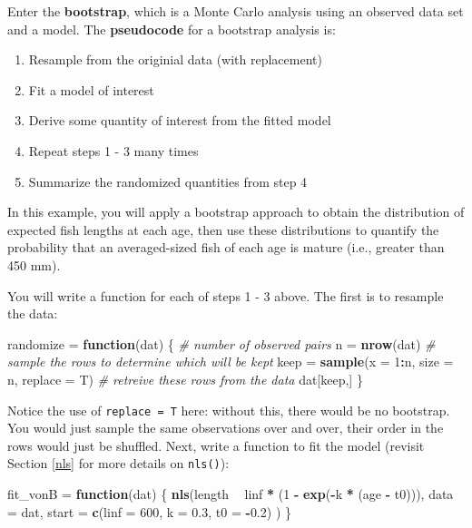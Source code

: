 \documentclass[]{book}
\newenvironment{Shaded}{\begin{snugshade}}{\end{snugshade}}
\newcommand{\KeywordTok}[1]{\textcolor[rgb]{0.13,0.29,0.53}{\textbf{#1}}}
\newcommand{\DataTypeTok}[1]{\textcolor[rgb]{0.13,0.29,0.53}{#1}}
\newcommand{\DecValTok}[1]{\textcolor[rgb]{0.00,0.00,0.81}{#1}}
\newcommand{\FloatTok}[1]{\textcolor[rgb]{0.00,0.00,0.81}{#1}}
\newcommand{\StringTok}[1]{\textcolor[rgb]{0.31,0.60,0.02}{#1}}
\newcommand{\CommentTok}[1]{\textcolor[rgb]{0.56,0.35,0.01}{\textit{#1}}}
\newcommand{\ControlFlowTok}[1]{\textcolor[rgb]{0.13,0.29,0.53}{\textbf{#1}}}
\newcommand{\OperatorTok}[1]{\textcolor[rgb]{0.81,0.36,0.00}{\textbf{#1}}}
\newcommand{\NormalTok}[1]{#1}
\providecommand{\tightlist}{%
  \setlength{\itemsep}{0pt}\setlength{\parskip}{0pt}}
\theoremstyle{definition}
\theoremstyle{definition}
\theoremstyle{definition}
\theoremstyle{remark}
\begin{document}
Enter the \textbf{bootstrap}, which is a Monte Carlo analysis using an
observed data set and a model. The \textbf{pseudocode} for a bootstrap
analysis is:

\begin{enumerate}
\def\labelenumi{\arabic{enumi}.}
\tightlist
\item
  Resample from the originial data (with replacement)
\item
  Fit a model of interest
\item
  Derive some quantity of interest from the fitted model
\item
  Repeat steps 1 - 3 many times
\item
  Summarize the randomized quantities from step 4
\end{enumerate}

In this example, you will apply a bootstrap approach to obtain the
distribution of expected fish lengths at each age, then use these
distributions to quantify the probability that an averaged-sized fish of
each age is mature (i.e., greater than 450 mm).

You will write a function for each of steps 1 - 3 above. The first is to
resample the data:

\begin{Shaded}
\begin{Highlighting}[]
\NormalTok{randomize =}\StringTok{ }\ControlFlowTok{function}\NormalTok{(dat) \{}
  \CommentTok{# number of observed pairs}
\NormalTok{  n =}\StringTok{ }\KeywordTok{nrow}\NormalTok{(dat)}
  \CommentTok{# sample the rows to determine which will be kept}
\NormalTok{  keep =}\StringTok{ }\KeywordTok{sample}\NormalTok{(}\DataTypeTok{x =} \DecValTok{1}\OperatorTok{:}\NormalTok{n, }\DataTypeTok{size =}\NormalTok{ n, }\DataTypeTok{replace =}\NormalTok{ T)}
  \CommentTok{# retreive these rows from the data}
\NormalTok{  dat[keep,]}
\NormalTok{\}}
\end{Highlighting}
\end{Shaded}

Notice the use of \texttt{replace\ =\ T} here: without this, there would
be no bootstrap. You would just sample the same observations over and
over, their order in the rows would just be shuffled. Next, write a
function to fit the model (revisit Section \ref{nls} for more details on
\texttt{nls()}):

\begin{Shaded}
\begin{Highlighting}[]
\NormalTok{fit_vonB =}\StringTok{ }\ControlFlowTok{function}\NormalTok{(dat) \{}
  \KeywordTok{nls}\NormalTok{(length }\OperatorTok{~}\StringTok{ }\NormalTok{linf }\OperatorTok{*}\StringTok{ }\NormalTok{(}\DecValTok{1} \OperatorTok{-}\StringTok{ }\KeywordTok{exp}\NormalTok{(}\OperatorTok{-}\NormalTok{k }\OperatorTok{*}\StringTok{ }\NormalTok{(age }\OperatorTok{-}\StringTok{ }\NormalTok{t0))),}
      \DataTypeTok{data =}\NormalTok{ dat,}
      \DataTypeTok{start =} \KeywordTok{c}\NormalTok{(}\DataTypeTok{linf =} \DecValTok{600}\NormalTok{, }\DataTypeTok{k =} \FloatTok{0.3}\NormalTok{, }\DataTypeTok{t0 =} \OperatorTok{-}\FloatTok{0.2}\NormalTok{)}
\NormalTok{      )}
\NormalTok{\}}
\end{Highlighting}
\end{Shaded}
\end{document}
